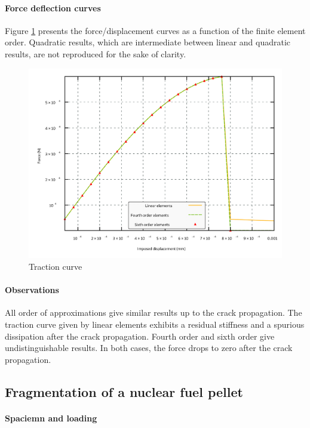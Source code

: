 \paragraph{Force deflection curves}

Figure \ref{fig:micromorphicdamage:traction_curve} presents the
force/displacement curves as a function of the finite element order.
Quadratic results, which are intermediate between linear and quadratic
results, are not reproduced for the sake of clarity.

\begin{figure}[H]
  \centering
  \includegraphics[width=10.cm]{../chapter_003_ef_micromorphic/figures/shear-driven-fracture-damage-results-force.pdf}
  \caption{Traction curve}
  \label{fig:micromorphicdamage:traction_curve}
\end{figure}

\paragraph{Observations}

All order of approximations give similar results up to the crack propagation.
The traction curve given by linear elements exhibits a residual
stiffness and a spurious dissipation after the crack propagation.
Fourth order and sixth order give undistinguishable results. In both
cases, the force drops to zero after the crack propagation.

\subsection{Fragmentation of a nuclear fuel pellet}

\paragraph{Spaciemn and loading}

